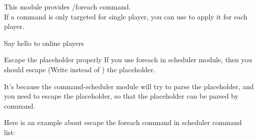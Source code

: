 
This module provides /foreach command.\\
If a command is only targeted for single player, you can use  to apply it for each player.


\begin{example}{Say hello to online players}
\end{example}

\begin{tips}{Escape the placeholder properly}
    If you use foreach in scheduler module, then you should escape (Write  instead of ) the placeholder.

    It's because the command-scheduler module will try to parse the placeholder, and you need to escape the placeholder, so that the placeholder can be parsed by  command.

    Here is an example about escape the foreach command in scheduler command list: 
\end{tips}